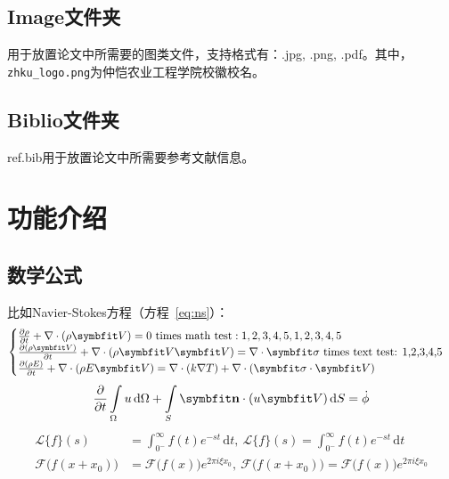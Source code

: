 {\subsection{Image文件夹}

用于放置论文中所需要的图类文件，支持格式有：.jpg, .png, .pdf。其中，\verb|zhku_logo.png|为仲恺农业工程学院校徽校名。

\subsection{Biblio文件夹}

 ref.bib用于放置论文中所需要参考文献信息。

\section{功能介绍}

\subsection{数学公式}

比如Navier-Stokes方程（方程~\eqref{eq:ns}）：
\begin{equation} \label{eq:ns}
    \begin{cases}
        \frac{\partial \rho}{\partial t} + \nabla\cdot(\rho\Vector{V}) = 0 \ \mathrm{times\ math\ test: 1,2,3,4,5}, 1,2,3,4,5\\
        \frac{\partial (\rho\Vector{V})}{\partial t} + \nabla\cdot(\rho\Vector{V}\Vector{V}) = \nabla\cdot\Tensor{\sigma} \ \text{times text test: 1,2,3,4,5}\\
        \frac{\partial (\rho E)}{\partial t} + \nabla\cdot(\rho E\Vector{V}) = \nabla\cdot(k\nabla T) + \nabla\cdot(\Tensor{\sigma}\cdot\Vector{V})
    \end{cases}
\end{equation}
\begin{equation}
    \frac{\partial }{\partial t}\int\limits_{\Omega} u \, \mathrm{d}\Omega + \int\limits_{S} \unitVector{n}\cdot(u\Vector{V}) \, \mathrm{d}S = \dot{\phi}
\end{equation}
\[
    \begin{split}
        \mathcal{L} \{f\}(s) &= \int _{0^{-}}^{\infty} f(t) e^{-st} \, \mathrm{d}t, \ 
        \mathscr{L} \{f\}(s) = \int _{0^{-}}^{\infty} f(t) e^{-st} \, \mathrm{d}t\\
        \mathcal{F} {\bigl (} f(x+x_{0}) {\bigr )} &= \mathcal{F} {\bigl (} f(x) {\bigr )} e^{2\pi i\xi x_{0}}, \ 
        \mathscr{F} {\bigl (} f(x+x_{0}) {\bigr )} = \mathscr{F} {\bigl (} f(x) {\bigr )} e^{2\pi i\xi x_{0}}
    \end{split}
\]

}
